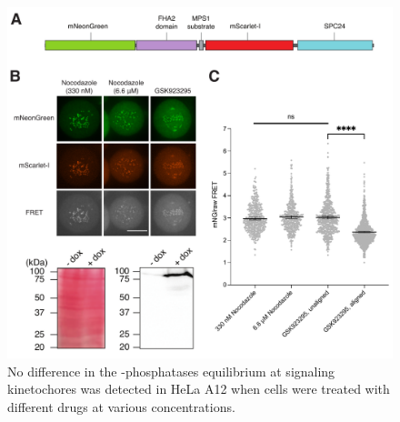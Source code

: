 \begin{figure}
    \centering
    \includegraphics[width=\textwidth]{chapters/figures/MPS1sen-KT.pdf}
    \caption{No difference in the -phosphatases equilibrium at signaling kinetochores was detected in HeLa A12 when cells were treated with different drugs at various concentrations.}
    \label{MPS1sen-KT}
\end{figure}
